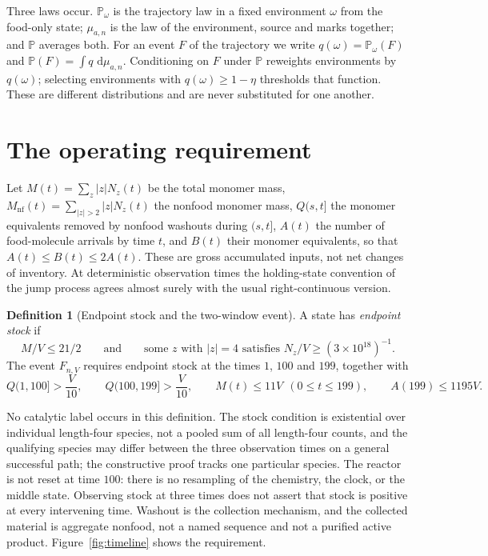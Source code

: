 \documentclass[11pt,letterpaper]{article}
\theoremstyle{plain}
\theoremstyle{definition}
\newtheorem{definition}[theorem]{Definition}
\theoremstyle{remark}
\numberwithin{equation}{section}
\newcommand{\PP}{\mathbb P}
\newcommand{\dd}{\,\mathrm d}
\newcommand{\nf}{\mathrm{nf}}
\newcommand{\floorstock}{(3\times10^{18})^{-1}}
\begin{document}
Three laws occur. $\PP_\omega$ is the trajectory law in a fixed environment $\omega$ from the food-only state; $\mu_{a,n}$ is the law of the environment, source and marks together; and $\PP$ averages both. For an event $F$ of the trajectory we write $q(\omega)=\PP_\omega(F)$ and $\PP(F)=\int q\,\dd\mu_{a,n}$. Conditioning on $F$ under $\PP$ reweights environments by $q(\omega)$; selecting environments with $q(\omega)\ge1-\eta$ thresholds that function. These are different distributions and are never substituted for one another.

\section{The operating requirement}\label{sec:event}

Let $M(t)=\sum_z|z|N_z(t)$ be the total monomer mass, $M_\nf(t)=\sum_{|z|>2}|z|N_z(t)$ the nonfood monomer mass, $Q(s,t]$ the monomer equivalents removed by nonfood washouts during $(s,t]$, $A(t)$ the number of food-molecule arrivals by time $t$, and $B(t)$ their monomer equivalents, so that $A(t)\le B(t)\le2A(t)$. These are gross accumulated inputs, not net changes of inventory. At deterministic observation times the holding-state convention of the jump process agrees almost surely with the usual right-continuous version.

\begin{definition}[Endpoint stock and the two-window event]\label{def:event}
A state has \emph{endpoint stock} if
\begin{equation}\label{eq:stock}
 M/V\le21/2\qquad\text{and}\qquad\text{some }z\text{ with }|z|=4\text{ satisfies }N_z/V\ge\floorstock .
\end{equation}
The event $F_{n,V}$ requires endpoint stock at the times $1$, $100$ and $199$, together with
\begin{equation}\label{eq:mission}
 Q(1,100]>\frac V{10},\qquad Q(100,199]>\frac V{10},\qquad
 M(t)\le11V\ \ (0\le t\le199),\qquad A(199)\le1195V .
\end{equation}
\end{definition}

No catalytic label occurs in this definition. The stock condition is existential over individual length-four species, not a pooled sum of all length-four counts, and the qualifying species may differ between the three observation times on a general successful path; the constructive proof tracks one particular species. The reactor is not reset at time $100$: there is no resampling of the chemistry, the clock, or the middle state. Observing stock at three times does not assert that stock is positive at every intervening time. Washout is the collection mechanism, and the collected material is aggregate nonfood, not a named sequence and not a purified active product. Figure~\ref{fig:timeline} shows the requirement.
\end{document}
